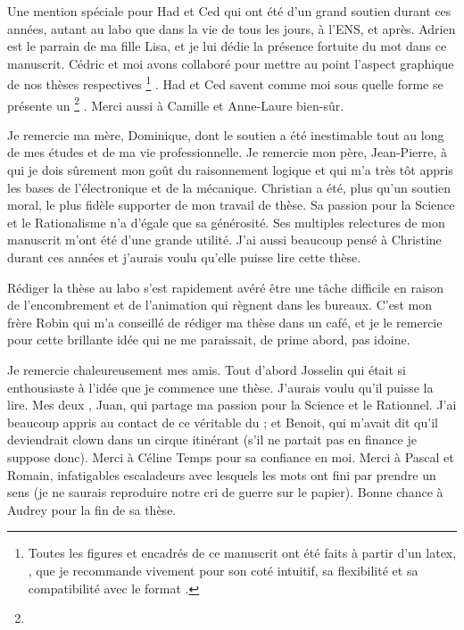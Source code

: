 \begin{ThesisAcknowledgments}
Une mention spéciale pour Had et Ced qui ont été d'un grand soutien durant ces années, autant au labo que dans la vie de tous les jours, à l'ENS, et après. 
Adrien est le parrain de ma fille Lisa, et je lui dédie la présence fortuite du mot  dans ce manuscrit.
Cédric et moi avons collaboré pour mettre au point l'aspect graphique de nos thèses respectives%
\footnote{Toutes les figures et encadrés de ce manuscrit ont été faits à partir d'un  latex, , que je recommande vivement pour son coté intuitif, sa flexibilité et sa compatibilité avec le format .}%
. Had et Ced savent comme moi sous quelle forme se présente un %
\footnote{}%
.
Merci aussi à Camille et Anne-Laure bien-sûr.

Je remercie ma mère, Dominique, dont le soutien a été inestimable tout au long de mes études et de ma vie professionnelle.
Je remercie mon père, Jean-Pierre, à qui je dois sûrement mon goût du raisonnement logique et qui m'a très tôt appris les bases de l'électronique et de la mécanique.
Christian a été, plus qu'un soutien moral, le plus fidèle supporter de mon travail de thèse.
Sa passion pour la Science et le Rationalisme n'a d'égale que sa générosité.
Ses multiples relectures de mon manuscrit m'ont été d'une grande utilité. J'ai aussi beaucoup pensé à Christine durant ces années et j'aurais voulu qu'elle puisse lire cette thèse.

Rédiger la thèse au labo s'est rapidement avéré être une tâche difficile en raison de l'encombrement et de l'animation qui règnent dans les bureaux. 
C'est mon frère Robin qui m'a conseillé de rédiger ma thèse dans un café, et je le remercie pour cette brillante idée qui ne me paraissait, de prime abord, pas idoine.
\RemonteUnPeuFig
{}
\RemonteUnPeuFig

Je remercie chaleureusement mes amis.
Tout d'abord Josselin qui était si enthousiaste à l'idée que je commence une thèse. J'aurais voulu qu'il puisse la lire.
Mes deux ,
Juan, qui partage ma passion pour la Science et le Rationnel. J'ai beaucoup appris au contact de ce véritable  du ; et
Benoit, qui m'avait dit qu'il deviendrait clown dans un cirque itinérant (s'il ne partait pas en finance je suppose donc).
Merci à Céline Temps pour sa confiance en moi.
Merci à Pascal et Romain, infatigables escaladeurs avec lesquels les mots  ont fini par prendre un sens (je ne saurais reproduire notre cri de guerre sur le papier). Bonne chance à Audrey pour la fin de sa thèse.


\end{ThesisAcknowledgments}
